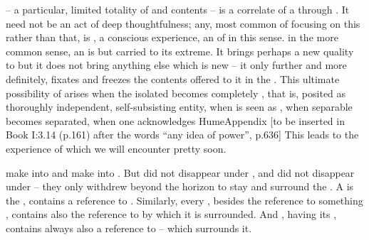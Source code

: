  -- a particular, limited totality of  and
 contents -- is a correlate of a  through
. It need not be an act of deep
thoughtfulness; any, most common  of focusing on this rather than that,
is , a conscious experience, an  of  in
this sense.   in the more common sense, an  is but  carried to its extreme.  It brings perhaps
a new quality to  but it does not bring anything else which is
new -- it only  further and more definitely, fixates and freezes
the contents offered to it in the .  This ultimate possibility of
 arises when the  isolated \thi{\ldots} becomes
completely , that is, posited as thoroughly independent,
self-subsisting entity, when  is seen as ,
when separable becomes separated, when one acknowledges \citet{that all our
  distinct perceptions are distinct existences, and that the mind never
  perceives any real connextion among distinct existences.}{Hume}{Appendix [to
  be inserted in Book I:3.14 (p.161) after the words ``any idea of power'',
  p.636]} This leads to the experience of  which we will
encounter pretty soon.

\pa {} make  into  and
 make  into . But  did
not disappear under , and  did not disappear under
 -- they only withdrew beyond the horizon to stay and surround
the . A  is the ,
contains a reference to .  Similarly, every ,
besides the reference to something , contains also the reference
to  by which it is surrounded. And , having 
 its , contains always also a
reference to  -- which surrounds it.


